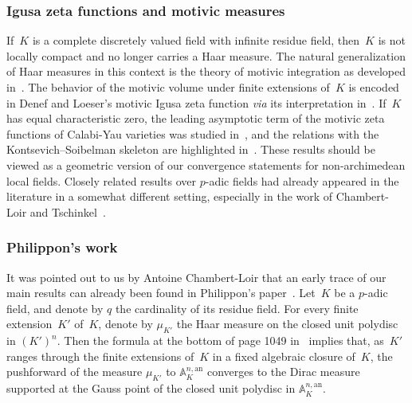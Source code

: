 \documentclass[11pt]{article}
\theoremstyle{definition}
\numberwithin{equation}{subsection}
\newcommand{\A}{\ensuremath{\mathbb{A}}}
\newcommand{\an}{\mathrm{an}}
\begin{document}
\subsubsection*{Igusa zeta functions and motivic measures}
If~$K$ is a complete discretely valued field with infinite residue field, then~$K$ is not locally compact and no longer carries a Haar measure. The natural generalization of Haar measures in this context is the theory of motivic integration as developed in~\cite{loeser-sebag}. The behavior of the motivic volume under finite extensions of~$K$ is encoded in Denef and Loeser's motivic Igusa zeta function {\em via} its interpretation in~\cite{nicaise-sebag}. If~$K$ has equal characteristic zero, the leading asymptotic term of the motivic zeta functions of Calabi-Yau varieties was studied in~\cite{halle-nicaise}, and the relations with the Kontsevich--Soibelman skeleton are highlighted in~\cite[3.2.3]{halle-nicaise}. These results should be viewed as a geometric version of our convergence statements for non-archimedean local fields.
Closely related results over $p$-adic fields had already appeared in the literature in a somewhat different setting, especially in the work of Chambert-Loir and Tschinkel~\cite{CLT}.

\subsubsection*{Philippon's work}
It was pointed out to us by Antoine Chambert-Loir that an early trace of our main results can already been found in Philippon's paper~\cite{philippon}. Let~$K$ be a $p$-adic field, and denote by $q$ the cardinality of its residue field.
For every finite extension~$K'$ of~$K$, denote by $\mu_{K'}$ the Haar measure on the closed unit polydisc in $(K')^n$.
Then the formula at the bottom of page 1049 in~\cite{philippon} implies that, as~$K'$ ranges through the finite extensions of~$K$ in a fixed algebraic closure of~$K$, the pushforward of the measure $\mu_{K'}$ to $\A^{n,\an}_K$ converges to the Dirac measure
supported at the Gauss point of the closed unit polydisc in $\A^{n,\an}_K$.
\end{document}
